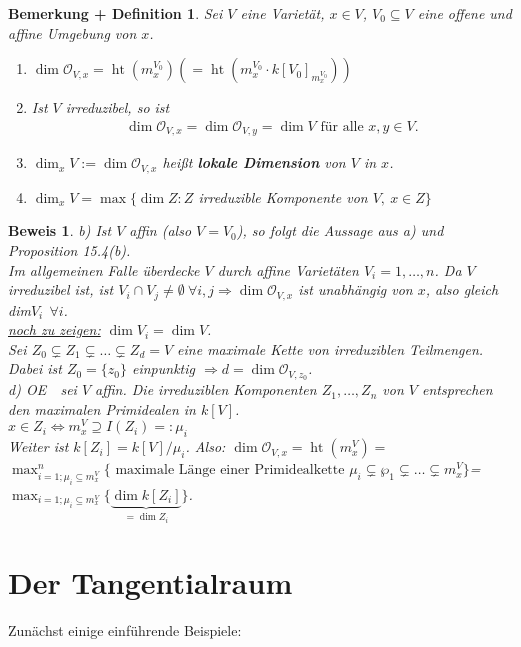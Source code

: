 \documentclass[a4paper,12pt]{report}
\theoremstyle{break}
\newtheorem{BemDef}[Def]{Bemerkung + Definition}
\theoremstyle{nonumberbreak}
\theoremstyle{nonumberplain}
\newtheorem{Bew}{Beweis}
\newcommand{\emp}[1]{\textbf{\emph{#1}}}
\newcommand{\begriff}[1]{{\index{#1}}\emp{#1}}
\DeclareMathOperator{\height}{ht}
\renewcommand{\OE}{O\!\!E~}
\begin{document}
\begin{BemDef}
  \label{bemdef:15.5}
  Sei $V$ eine Varietät, $x\in V$, $V_0\subseteq V$ eine offene und affine Umgebung von $x$.
  \begin{enumerate}
  \item $\dim\mathcal{O}_{V,x}=\height(m_x^{V_0}) (=\height(m_x^{V_0}\cdot k[V_0]_{m_x^{V_0}}))$
  \item Ist $V$ irreduzibel, so ist 
    \begin{align*}
      \dim\mathcal{O}_{V,x}=\dim\mathcal{O}_{V,y}=\dim V\text{ für alle } x,y \in V.
    \end{align*}
\item $\dim_xV:=\dim\mathcal{O}_{V,x}$ heißt \begriff{lokale Dimension} von $V$ in $x$.
\item $\dim_xV=\max\{ \dim Z: Z$ irreduzible Komponente von $V,~x\in Z\}$
\end{enumerate}
\end{BemDef}

\begin{Bew}
b) Ist $V$ affin (also $V=V_0$), so folgt die Aussage aus a) und Proposition 15.4(b).\\
Im allgemeinen Falle überdecke $V$ durch affine Varietäten $V_i=1,\dots,n$. Da $V$ irreduzibel ist, ist $V_i\cap V_j\neq \emptyset~\forall i,j\Rightarrow \dim \mathcal{O}_{V,x}$ ist unabhängig von $x$, also gleich dim$V_i~~\forall i$.\\
\underline{noch zu zeigen:} $\dim V_i= \dim V$.\\
Sei $Z_0\subsetneq Z_1\subsetneq\dots\subsetneq Z_d=V$ eine maximale Kette von irreduziblen Teilmengen. Dabei ist $Z_0=\{z_0\}$ einpunktig $\Rightarrow d= \dim \mathcal{O}_{V,z_0}$.\\
d) \OE ~sei $V$ affin. Die irreduziblen Komponenten $Z_1,\dots,Z_n$ von $V$ entsprechen den maximalen Primidealen in $k[V]$.\\
$x\in Z_i\Leftrightarrow m_x^V\supseteq I(Z_i)=:\mu_i$\\
Weiter ist $k[Z_i]=k[V]/\mu_i$.
Also: $\dim\mathcal{O}_{V,x}=\height(m_x^V)=$\\
$\max_{i=1; \mu_i\subseteq m_x^V}^n\{\text{ maximale Länge einer Primidealkette } \mu_i\subsetneq \wp_1\subsetneq\dots\subsetneq m_x^V\}$=\\
$\max_{i=1; \mu_i\subseteq m_x^V}\{\underbrace{\dim k[Z_i]}_{= \dim Z_i}\}$.
\end{Bew}
\section{Der Tangentialraum}
Zunächst einige einführende Beispiele:
\end{document}
